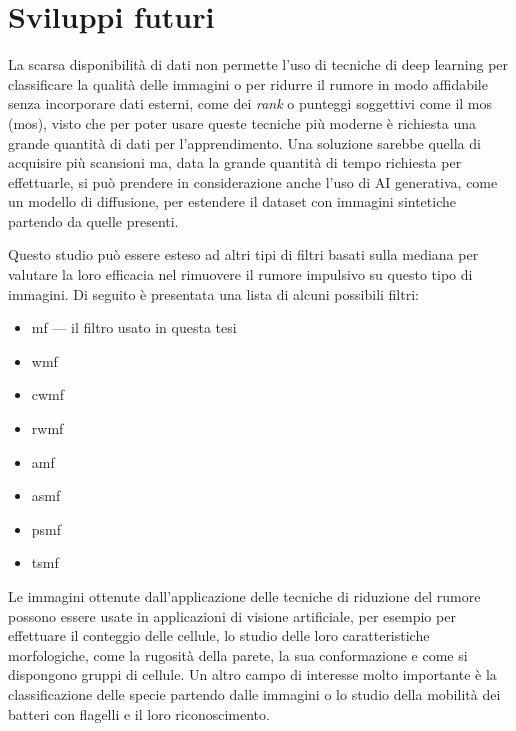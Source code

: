 \documentclass[../main.tex]{subfiles}
\begin{document}
\section{Sviluppi futuri}

La scarsa disponibilità di dati non permette l'uso di tecniche di deep learning per classificare la qualità delle immagini o per ridurre il rumore in modo affidabile senza incorporare dati esterni, come dei \textit{rank} o punteggi soggettivi come il \acrshort{mos} (\acrlong{mos}), visto che per poter usare queste tecniche più moderne è richiesta una grande quantità di dati per l'apprendimento.\cite{lecun_2015,litjens_2017,bosse_2018} Una soluzione sarebbe quella di acquisire più scansioni ma, data la grande quantità di tempo richiesta per effettuarle, si può prendere in considerazione anche l'uso di AI generativa, come un modello di diffusione, per estendere il dataset con immagini sintetiche partendo da quelle presenti.\cite{ho_2020}

Questo studio può essere esteso ad altri tipi di filtri basati sulla mediana per valutare la loro efficacia nel rimuovere il rumore impulsivo su questo tipo di immagini. Di seguito è presentata una lista di alcuni possibili filtri:

\begin{itemize}
	\itemsep 0em
	\item \acrfull{mf}\cite{gallagher_1981} --- il filtro usato in questa tesi
	\item \acrfull{wmf}\cite{zhang_2009}
	\item \acrfull{cwmf}\cite{ko_1991}
	\item \acrfull{rwmf}\cite{kumar_2007}
	\item \acrfull{amf}\cite{chen_2001}
	\item \acrfull{asmf}\cite{khryashchev_2005}
	\item \acrfull{psmf}\cite{wang_1999}
	\item \acrfull{tsmf}\cite{chen_1999}
\end{itemize}

Le immagini ottenute dall'applicazione delle tecniche di riduzione del rumore possono essere usate in applicazioni di visione artificiale, per esempio per effettuare il conteggio delle cellule, lo studio delle loro caratteristiche morfologiche, come la rugosità della parete, la sua conformazione e come si dispongono gruppi di cellule. Un altro campo di interesse molto importante è la classificazione delle specie partendo dalle immagini o lo studio della mobilità dei batteri con flagelli e il loro riconoscimento.
\end{document}
